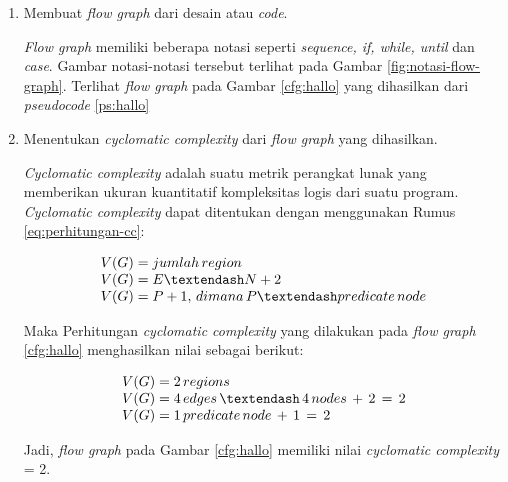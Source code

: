 \begin{enumerate}[
leftmargin=0pt, itemindent=20pt,
labelwidth=15pt, labelsep=5pt, listparindent=0.7cm,
align=left]
\item Membuat \emph{flow graph} dari desain atau \emph{code}.

  \emph{Flow graph} memiliki beberapa notasi seperti \emph{sequence,
    if, while, until} dan \emph{case}. Gambar notasi-notasi tersebut
  terlihat pada Gambar \ref{fig:notasi-flow-graph}. Terlihat \emph{flow graph}
  pada Gambar \ref{cfg:hallo} yang dihasilkan dari
  \emph{pseudocode} \ref{ps:hallo}

\item Menentukan \emph{cyclomatic complexity} dari \emph{flow graph}
  yang dihasilkan.

  \emph{Cyclomatic complexity} adalah suatu metrik perangkat lunak
  yang memberikan ukuran kuantitatif kompleksitas logis dari suatu
  program. \emph{Cyclomatic complexity} dapat ditentukan dengan menggunakan
  Rumus \ref{eq:perhitungan-cc}:

  \begin{equation}
    \begin{array}{l}
      V(G) = jumlah \thinspace region \\
      V(G) = E – N + 2 \\
      V(G) = P + 1, \thinspace dimana \thinspace P – predicate \thinspace node
    \end{array}
    \label{eq:perhitungan-cc}
  \end{equation}

  Maka Perhitungan \emph{cyclomatic complexity} yang dilakukan pada
  \emph{flow graph} \ref{cfg:hallo} menghasilkan
  nilai sebagai berikut:

  \begin{equation}
    \begin{array}{l}
      V(G) = 2 \thinspace regions \\
      V(G) = 4 \thinspace edges \thinspace – \thinspace 4 \thinspace
      nodes \thinspace + \thinspace 2 \thinspace = \thinspace 2 \\
      V(G) = 1 \thinspace predicate \thinspace node \thinspace +
      \thinspace 1 \thinspace = \thinspace 2
    \end{array}
    \label{eq:hasil-perhitungan-cc}
  \end{equation}

 Jadi, \emph{flow graph} pada Gambar \ref{cfg:hallo} memiliki nilai
 \emph{cyclomatic complexity} = 2.


\end{enumerate}

